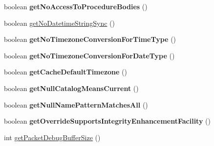 \begin{DoxyCompactItemize}
boolean {\bfseries get\+No\+Access\+To\+Procedure\+Bodies} ()
\item 
boolean \mbox{\hyperlink{classcom_1_1mysql_1_1jdbc_1_1jdbc2_1_1optional_1_1_connection_wrapper_aa17bed727b36f4557e32e581a7abff7f}{get\+No\+Datetime\+String\+Sync}} ()
\item 
\mbox{\label{classcom_1_1mysql_1_1jdbc_1_1jdbc2_1_1optional_1_1_connection_wrapper_a8dd78dcfbda6b5be77a7ea8ccfd7a7ed}} 
boolean {\bfseries get\+No\+Timezone\+Conversion\+For\+Time\+Type} ()
\item 
\mbox{\label{classcom_1_1mysql_1_1jdbc_1_1jdbc2_1_1optional_1_1_connection_wrapper_a2bcc3961e8b6a6835ffa18f4f4d8e70d}} 
boolean {\bfseries get\+No\+Timezone\+Conversion\+For\+Date\+Type} ()
\item 
\mbox{\label{classcom_1_1mysql_1_1jdbc_1_1jdbc2_1_1optional_1_1_connection_wrapper_a57c465e3434cb5b0aebeb2b6a1011ae5}} 
boolean {\bfseries get\+Cache\+Default\+Timezone} ()
\item 
\mbox{\label{classcom_1_1mysql_1_1jdbc_1_1jdbc2_1_1optional_1_1_connection_wrapper_a830f1101ef0cac408c098738c32d63dc}} 
boolean {\bfseries get\+Null\+Catalog\+Means\+Current} ()
\item 
\mbox{\label{classcom_1_1mysql_1_1jdbc_1_1jdbc2_1_1optional_1_1_connection_wrapper_a70b8ce56439f91bd6f50ba82a5953ba8}} 
boolean {\bfseries get\+Null\+Name\+Pattern\+Matches\+All} ()
\item 
\mbox{\label{classcom_1_1mysql_1_1jdbc_1_1jdbc2_1_1optional_1_1_connection_wrapper_a34f65316b3823188a1678e1f6f34c7bc}} 
boolean {\bfseries get\+Override\+Supports\+Integrity\+Enhancement\+Facility} ()
\item 
int \mbox{\hyperlink{classcom_1_1mysql_1_1jdbc_1_1jdbc2_1_1optional_1_1_connection_wrapper_ad3f5f474a7148a078c7cb5ff6b9b1a9d}{get\+Packet\+Debug\+Buffer\+Size}} ()
\item 

\end{DoxyCompactItemize}
